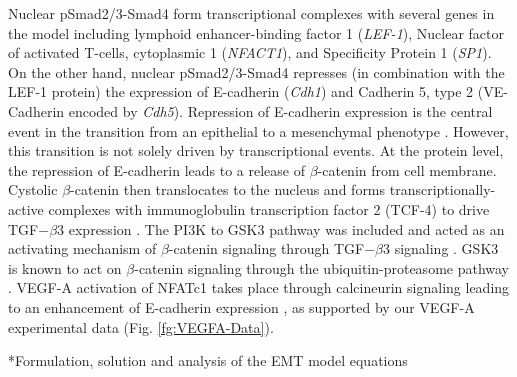 \documentclass[12pt]{article}
\makeatletter
\renewcommand\subsection{\@startsection
	{subsection}{2}{0mm}
	{-0.05in}
	{-0.5\baselineskip}
	{\normalfont\normalsize\bfseries}}
\makeatother
\begin{document}
Nuclear pSmad2/3-Smad4 form transcriptional complexes with several genes in the model including lymphoid enhancer-binding factor 1 (\emph{LEF-1}), Nuclear factor of activated T-cells, cytoplasmic 1 (\emph{NFACT1}), and Specificity Protein 1 (\emph{SP1}).  On the other hand, nuclear pSmad2/3-Smad4 represses (in combination with the LEF-1 protein) the expression of E-cadherin (\emph{Cdh1}) \citep{Nawshad:2007kl} and Cadherin 5, type 2 (VE-Cadherin encoded by \emph{Cdh5}).
Repression of E-cadherin expression is the central event in the transition from an epithelial to a mesenchymal phenotype \citep{Cano:2000kh}.
However, this transition is not solely driven by transcriptional events.
At the protein level, the repression of E-cadherin leads to a release of $\beta$-catenin from cell membrane.
Cystolic $\beta$-catenin then translocates to the nucleus and forms transcriptionally-active complexes with immunoglobulin transcription factor 2 (TCF-4)
to drive TGF$-\beta$3 expression \citep{Medici:2008fk}. The PI3K to GSK3 pathway was included and acted as an activating mechanism of $\beta$-catenin signaling through TGF$-\beta$3 signaling \citep{Medici:2008fk}. GSK3 is known to act on $\beta$-catenin signaling through the ubiquitin-proteasome pathway
\citep{Zhou:2004kx,Larue:2005vn}.
VEGF-A activation of NFATc1 takes place through calcineurin signaling leading to an enhancement of E-cadherin expression \citep{Suehiro:2014aa},
as supported by our VEGF-A experimental data (Fig. \ref{fg:VEGFA-Data}).


\subsection*{Formulation, solution and analysis of the EMT model equations}
\end{document}
